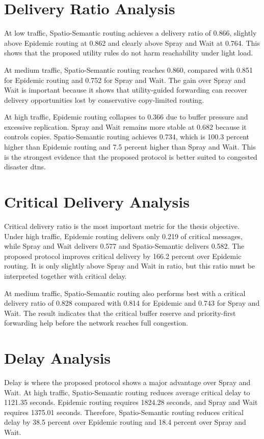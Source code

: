 \section{Delivery Ratio Analysis}
At low traffic, Spatio-Semantic routing achieves a delivery ratio of 0.866, slightly above Epidemic routing at 0.862 and clearly above Spray and Wait at 0.764. This shows that the proposed utility rules do not harm reachability under light load.

At medium traffic, Spatio-Semantic routing reaches 0.860, compared with 0.851 for Epidemic routing and 0.752 for Spray and Wait. The gain over Spray and Wait is important because it shows that utility-guided forwarding can recover delivery opportunities lost by conservative copy-limited routing.

At high traffic, Epidemic routing collapses to 0.366 due to buffer pressure and excessive replication. Spray and Wait remains more stable at 0.682 because it controls copies. Spatio-Semantic routing achieves 0.734, which is 100.3 percent higher than Epidemic routing and 7.5 percent higher than Spray and Wait. This is the strongest evidence that the proposed protocol is better suited to congested disaster \acp{dtn}.

\section{Critical Delivery Analysis}
Critical delivery ratio is the most important metric for the thesis objective. Under high traffic, Epidemic routing delivers only 0.219 of critical messages, while Spray and Wait delivers 0.577 and Spatio-Semantic delivers 0.582. The proposed protocol improves critical delivery by 166.2 percent over Epidemic routing. It is only slightly above Spray and Wait in ratio, but this ratio must be interpreted together with critical delay.

At medium traffic, Spatio-Semantic routing also performs best with a critical delivery ratio of 0.828 compared with 0.814 for Epidemic and 0.743 for Spray and Wait. The result indicates that the critical buffer reserve and priority-first forwarding help before the network reaches full congestion.

\section{Delay Analysis}
Delay is where the proposed protocol shows a major advantage over Spray and Wait. At high traffic, Spatio-Semantic routing reduces average critical delay to 1121.35 seconds. Epidemic routing requires 1824.28 seconds, and Spray and Wait requires 1375.01 seconds. Therefore, Spatio-Semantic routing reduces critical delay by 38.5 percent over Epidemic routing and 18.4 percent over Spray and Wait.

